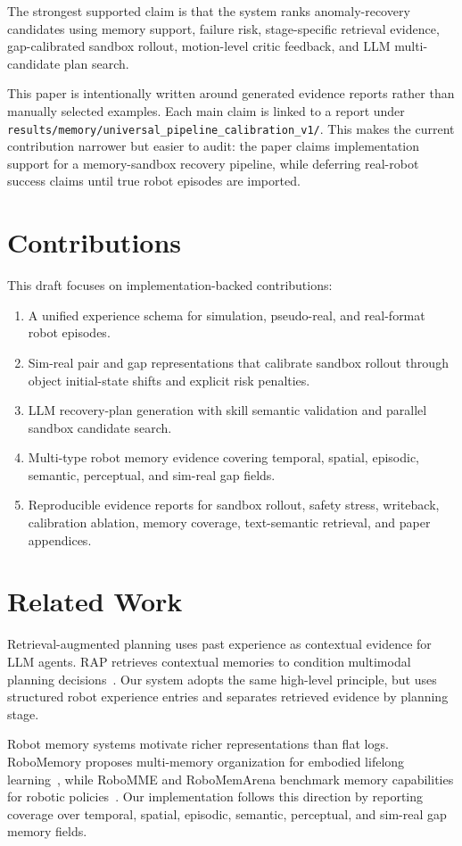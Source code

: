 \documentclass[conference]{IEEEtran}
\begin{document}
The strongest supported claim is that the system ranks anomaly-recovery candidates using memory support, failure risk, stage-specific retrieval evidence, gap-calibrated sandbox rollout, motion-level critic feedback, and LLM multi-candidate plan search.

This paper is intentionally written around generated evidence reports rather than manually selected examples. Each main claim is linked to a report under \texttt{results/memory/universal\_pipeline\_calibration\_v1/}. This makes the current contribution narrower but easier to audit: the paper claims implementation support for a memory-sandbox recovery pipeline, while deferring real-robot success claims until true robot episodes are imported.

\section{Contributions}
This draft focuses on implementation-backed contributions:
\begin{enumerate}
    \item A unified experience schema for simulation, pseudo-real, and real-format robot episodes.
    \item Sim-real pair and gap representations that calibrate sandbox rollout through object initial-state shifts and explicit risk penalties.
    \item LLM recovery-plan generation with skill semantic validation and parallel sandbox candidate search.
    \item Multi-type robot memory evidence covering temporal, spatial, episodic, semantic, perceptual, and sim-real gap fields.
    \item Reproducible evidence reports for sandbox rollout, safety stress, writeback, calibration ablation, memory coverage, text-semantic retrieval, and paper appendices.
\end{enumerate}

\section{Related Work}
Retrieval-augmented planning uses past experience as contextual evidence for LLM agents. RAP retrieves contextual memories to condition multimodal planning decisions~\cite{kagaya2024rap}. Our system adopts the same high-level principle, but uses structured robot experience entries and separates retrieved evidence by planning stage.

Robot memory systems motivate richer representations than flat logs. RoboMemory proposes multi-memory organization for embodied lifelong learning~\cite{lei2025robomemory}, while RoboMME and RoboMemArena benchmark memory capabilities for robotic policies~\cite{dai2026robomme,lei2026robomemarena}. Our implementation follows this direction by reporting coverage over temporal, spatial, episodic, semantic, perceptual, and sim-real gap memory fields.
\end{document}
